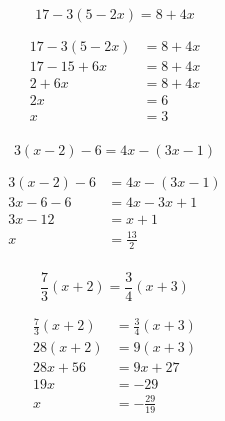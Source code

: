 \documentclass[letterpaper, landscape]{exam}
\begin{document}
  \begin{questions}
    

    \question[5]
      \[ 
        17 - 3(5 - 2x) = 8 + 4x
      \]

      \begin{solution}
        \begin{align*}
          17 - 3(5 - 2x) & = 8 + 4x \\
          17 - 15 + 6x   & = 8 + 4x \\
          2 + 6x         & = 8 + 4x \\
          2x             & = 6 \\
          x              & = \boxed{ 3 } \\
        \end{align*}
      \end{solution}

    \question[5]
      \[
        3(x - 2) - 6 = 4x - (3x - 1)
      \]

      \begin{solution}
        \begin{align*}
        3(x - 2) - 6 & = 4x - (3x - 1) \\
        3x - 6 - 6   & = 4x - 3x + 1 \\
        3x - 12      & = x + 1 \\
        x            & = \boxed{ \frac{13}{2} } \\
        \end{align*}
      \end{solution}

    \ifprintanswers{}
      \newpage
    \fi

    \question[10]
      \[ 
        \frac{7}{3} (x + 2) = \frac{3}{4} (x + 3)
      \]

      \begin{solution}
        \begin{align*}
          \frac{7}{3} (x + 2) & = \frac{3}{4} (x + 3) \\
          28 (x + 2)          & = 9 (x + 3) \\
          28x + 56            & = 9x + 27 \\
          19x                 & = -29 \\
          x                   & = \boxed{ - \frac{29}{19} } \\
        \end{align*}
      \end{solution}


\end{questions}
\end{document}
